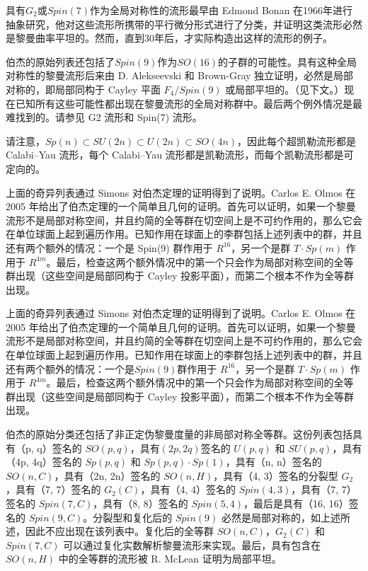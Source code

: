 具有\(G_2\)或\(Spin(7)\)作为全局对称性的流形最早由 Edmond Bonan 在1966年进行抽象研究，他对这些流形所携带的平行微分形式进行了分类，并证明这类流形必然是黎曼曲率平坦的。然而，直到30年后，才实际构造出这样的流形的例子。

伯杰的原始列表还包括了\(Spin(9)\)作为\(SO(16)\)的子群的可能性。具有这种全局对称性的黎曼流形后来由 D. Alekseevski 和 Brown-Gray 独立证明，必然是局部对称的，即局部同构于 Cayley 平面 \( F_4 / Spin(9) \) 或局部平坦的。（见下文。）现在已知所有这些可能性都出现在黎曼流形的全局对称群中。最后两个例外情况是最难找到的。请参见 G2 流形和 Spin(7) 流形。

请注意，\( Sp(n) \subset SU(2n) \subset U(2n) \subset SO(4n) \)，因此每个超凯勒流形都是 Calabi–Yau 流形，每个 Calabi–Yau 流形都是凯勒流形，而每个凯勒流形都是可定向的。

上面的奇异列表通过 Simons 对伯杰定理的证明得到了说明。Carlos E. Olmos 在 2005 年给出了伯杰定理的一个简单且几何的证明。首先可以证明，如果一个黎曼流形不是局部对称空间，并且约简的全等群在切空间上是不可约作用的，那么它会在单位球面上起到遍历作用。已知作用在球面上的李群包括上述列表中的群，并且还有两个额外的情况：一个是 Spin(9) 群作用于 \( R^{16} \)，另一个是群 \( T \cdot Sp(m) \) 作用于 \( R^{4m} \)。最后，检查这两个额外情况中的第一个只会作为局部对称空间的全等群出现（这些空间是局部同构于 Cayley 投影平面），而第二个根本不作为全等群出现。

上面的奇异列表通过 Simons 对伯杰定理的证明得到了说明。Carlos E. Olmos 在 2005 年给出了伯杰定理的一个简单且几何的证明。首先可以证明，如果一个黎曼流形不是局部对称空间，并且约简的全等群在切空间上是不可约作用的，那么它会在单位球面上起到遍历作用。已知作用在球面上的李群包括上述列表中的群，并且还有两个额外的情况：一个是\(Spin(9)\)群作用于 \( R^{16} \)，另一个是群 \( T \cdot Sp(m) \) 作用于 \( R^{4m} \)。最后，检查这两个额外情况中的第一个只会作为局部对称空间的全等群出现（这些空间是局部同构于 Cayley 投影平面），而第二个根本不作为全等群出现。

伯杰的原始分类还包括了非正定伪黎曼度量的非局部对称全等群。这份列表包括具有（p, q）签名的 \( SO(p, q) \)，具有\((2p, 2q)\)签名的 \( U(p, q) \) 和 \( SU(p, q) \)，具有（4p, 4q）签名的 \( Sp(p, q) \) 和 \( Sp(p, q) \cdot Sp(1) \)，具有（n, n）签名的 \( SO(n, C) \)，具有（2n, 2n）签名的 \( SO(n, H) \)，具有（4, 3）签名的分裂型 \( G_2 \)，具有（7, 7）签名的 \( G_2(C) \)，具有（4, 4）签名的 \( Spin(4, 3) \)，具有（7, 7）签名的 \( Spin(7, C) \)，具有（8, 8）签名的 \( Spin(5, 4) \)，最后是具有（16, 16）签名的 \( Spin(9, C) \)。分裂型和复化后的 \( Spin(9) \) 必然是局部对称的，如上述所述，因此不应出现在该列表中。复化后的全等群 \( SO(n, C) \)，\( G_2(C) \) 和 \( Spin(7, C) \) 可以通过复化实数解析黎曼流形来实现。最后，具有包含在 \( SO(n, H) \) 中的全等群的流形被 R. McLean 证明为局部平坦。
